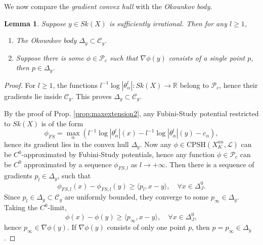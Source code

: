 \documentclass[a4paper]{article}
\newtheorem{lem}[thm]{Lemma}
\theoremstyle{definition}
\newcommand{\R}{\mathbb{R}}
\begin{document}
We now compare the \emph{gradient convex hull} with the \emph{Okounkov body}.


\begin{lem}\label{lem:gradientconvexhullOkounkovbody}
	Suppose $y\in Sk(X)$ is sufficiently irrational. Then for any $l\geq 1$, 
	\begin{enumerate}
	
		
		
		\item  The Okounkov body $\Delta_y\subset \mathcal{C}_y$.
		
		
		\item  Suppose there is some $\phi\in \mathcal{P}_c$ such that $\nabla\phi(y)$ consists of a single point $p$, then $p\in \Delta_y$.
	\end{enumerate}
	
	
	

\end{lem}

	
	
	\begin{proof}

	

	For $l\geq 1$, the functions $l^{-1} \log |\theta_\alpha^l| : Sk(X)\to \R$ belong to $\mathcal{P}_c$, hence their gradients lie inside $\mathcal{C}_y$. This proves $\Delta_y\subset \mathcal{C}_y$.  
	
	
	
	By the proof of Prop. \ref{prop:maxextension2}, any Fubini-Study potential restricted to $Sk(X)$ is of the form 
		\[
	\phi_{FS}= \max_\alpha (l^{-1}\log |\theta_\alpha^l|(x)-   l^{-1}\log |\theta_\alpha^l|(y) -     c_\alpha),
	\]
	hence its gradient lies in the convex hull $\Delta_y$. Now any $\phi\in  \text{CPSH}(X_K^{an},\mathcal{L})$ can be $C^0$-approximated by Fubini-Study potentials, hence any function  $\phi\in \mathcal{P}_c$ can be $C^0$ approximated by a sequence $\phi_{FS,l}$ as $l\to +\infty$. Then there is a sequence of gradients $p_l\in \Delta_y$, such that
	\[
	\phi_{FS, l} (x)- \phi_{FS,l}(y)\geq \langle p_l, x-y\rangle, \quad \forall x\in \Delta_J^0.
	\]
	Since $p_l\in \Delta_y\subset \mathcal{C}_y$ are uniformly bounded, they converge to some $p_\infty\in \Delta_y$.
	Taking the $C^0$-limit,
	\[
	\phi(x)- \phi(y) \geq \langle p_\infty, x-y\rangle, \quad \forall x\in \Delta_J^0,
	\]
	hence $p_\infty\in \nabla \phi(y)$. If $\nabla \phi(y)$ consists of only one point $p$, then $p=p_\infty\in \Delta_y$.
	\end{proof}
	
	
	
\end{document}
